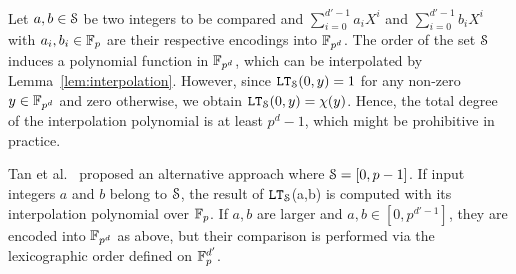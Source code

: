   Let $a,b \in \S$ be two integers to be compared and $\sum_{i=0}^{d'-1} a_i X^i$ and $\sum_{i=0}^{d'-1} b_i X^i$ with $a_i, b_i \in \F_p$ are their respective encodings into $\F_{p^d}$.
  The order of the set $\S$ induces a polynomial function in $\F_{p^d}$, which can be interpolated by Lemma~\ref{lem:interpolation}.
  However, since $\LT_\S(0,y) = 1$ for any non-zero $y \in \F_{p^d}$ and zero otherwise, we obtain $\LT_\S(0,y) = \chi(y)$.
  Hence, the total degree of the interpolation polynomial is at least $p^d-1$, 
  which might be prohibitive in practice.

  Tan et al.~\cite{TLWRK20} proposed an alternative approach where $\S = [0,p-1]$.
  If input integers $a$ and $b$ belong to $\S$, the result of $\LT_\S$(a,b) is computed with its interpolation polynomial over $\F_p$.  
  If $a,b$ are larger and $a,b \in [0,p^{d'-1}]$, they are encoded into $\F_{p^d}$ as above, but their comparison is performed via the lexicographic order defined on $\F_p^{d'}$.

